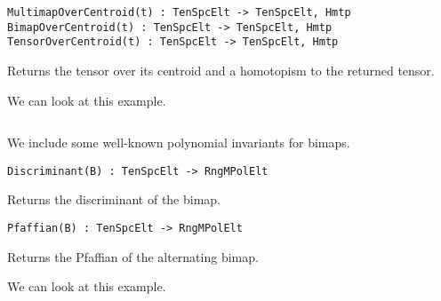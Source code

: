 \documentclass{amsart}
\begin{document}
\color{blue}
{\small \begin{verbatim}
MultimapOverCentroid(t) : TenSpcElt -> TenSpcElt, Hmtp
BimapOverCentroid(t) : TenSpcElt -> TenSpcElt, Hmtp
TensorOverCentroid(t) : TenSpcElt -> TenSpcElt, Hmtp
\end{verbatim} }
\color{black}

Returns the tensor over its centroid and a homotopism to the returned tensor.

We can look at this example.
{\small
\begin{lstlisting}[frame=single,basicstyle=\ttfamily\color{black!30!teal},backgroundcolor=\color{white!70!gray}]
\end{lstlisting}
}

We include some well-known polynomial invariants for bimaps.
\color{blue}
{\small \begin{verbatim}
Discriminant(B) : TenSpcElt -> RngMPolElt
\end{verbatim} }
\color{black}

Returns the discriminant of the bimap.

\color{blue}
{\small \begin{verbatim}
Pfaffian(B) : TenSpcElt -> RngMPolElt
\end{verbatim} }
\color{black}

Returns the Pfaffian of the alternating bimap.

We can look at this example.
{\small
\begin{lstlisting}[frame=single,basicstyle=\ttfamily\color{black!30!teal},backgroundcolor=\color{white!70!gray}]
\end{lstlisting}
}

\begin{bibdiv}
\begin{biblist}



\end{biblist}
\end{bibdiv}

{\tt
\printindex
}
\end{document}
